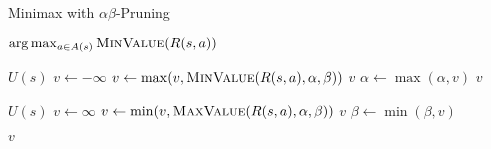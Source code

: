 \begin{algorithm}[H]
    \caption{Minimax with $\alpha\beta$-Pruning}
    \label{alg:alphabeta}
    \begin{algorithmic}[1]
    
        \State \Return $\arg\max_{a \in A(s)} \textproc{MinValue}(R(s, a))$
    \EndProcedure
    \end{algorithmic}

    \begin{algorithmic}[1]

            \Return $U(s)$
        \EndIf
        \State $v \leftarrow -\infty$
            \State $v \leftarrow \max(v, \textproc{MinValue}(R(s, a), \alpha, \beta))$
                \Return $v$
            \EndIf
            \State $\alpha \leftarrow \max(\alpha, v)$
        \EndFor
        \State \Return $v$
    \EndProcedure
    
    \end{algorithmic}
        
    \begin{algorithmic}[1]

            \Return $U(s)$
        \EndIf
        \State $v \leftarrow \infty$
            \State $v \leftarrow \min(v, \textproc{MaxValue}(R(s, a), \alpha, \beta))$
                \Return $v$
            \EndIf
            \State $\beta \leftarrow \min(\beta, v)$
        \EndFor

        \State \Return $v$
    \EndProcedure

    \end{algorithmic}
\end{algorithm}